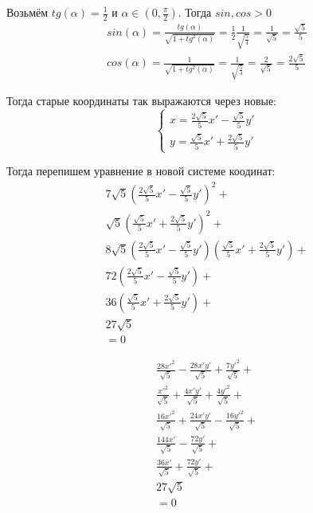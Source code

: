 \documentclass[12pt, a4paper]{article}
\begin{document}
    Возьмём $tg(\alpha) = \frac{1}{2}$ и $\alpha \in (0, \frac{\pi}{2})$.
    Тогда $sin, cos > 0$
    \begin{gather}
        sin(\alpha) = \frac{tg(\alpha)}{\sqrt{1 + tg^2(\alpha)}} = \frac{1}{2} \frac{1}{\sqrt{\frac{5}{4}}} = \frac{1}{\sqrt{5}} = \frac{\sqrt{5}}{5} \\
        cos(\alpha) = \frac{1}{\sqrt{1 + tg^2(\alpha)}} = \frac{1}{\sqrt{\frac{5}{4}}} = \frac{2}{\sqrt{5}} = \frac{2\sqrt{5}}{5}
    \end{gather}

    Тогда старые координаты так выражаются через новые:
    \begin{equation}
        \begin{cases}
            x = \frac{2\sqrt{5}}{5} x' - \frac{\sqrt{5}}{5} y' \\
            y = \frac{\sqrt{5}}{5} x' + \frac{2\sqrt{5}}{5} y'
        \end{cases}
    \end{equation}

    Тогда перепишем уравнение в новой системе коодинат:
    \begin{multline}
        7\sqrt{5} \left(\frac{2\sqrt{5}}{5} x' - \frac{\sqrt{5}}{5} y'\right)^2 + \\
        \sqrt{5} \left(\frac{\sqrt{5}}{5} x' + \frac{2\sqrt{5}}{5} y'\right)^2 + \\
        8\sqrt{5} \left(\frac{2\sqrt{5}}{5} x' - \frac{\sqrt{5}}{5} y'\right)\left(\frac{\sqrt{5}}{5} x' + \frac{2\sqrt{5}}{5} y'\right) + \\
        72 \left(\frac{2\sqrt{5}}{5} x' - \frac{\sqrt{5}}{5} y'\right) + \\
        36 \left(\frac{\sqrt{5}}{5} x' + \frac{2\sqrt{5}}{5} y' \right) + \\
        27\sqrt{5} \\
        = 0
    \end{multline}

    \begin{multline}
        \frac{28 x'^2}{\sqrt{5}} - \frac{28 x' y'}{\sqrt{5}} + \frac{7 y'^2}{\sqrt{5}} + \\
        \frac{x'^2}{\sqrt{5}} + \frac{4 x' y'}{\sqrt{5}} + \frac{4 y'^2}{\sqrt{5}} + \\
        \frac{16 x'^2}{\sqrt{5}} + \frac{24 x' y'}{\sqrt{5}} - \frac{16 y'^2}{\sqrt{5}} + \\
        \frac{144 x'}{\sqrt{5}} - \frac{72 y'}{\sqrt{5}} + \\
        \frac{36 x'}{\sqrt{5}} + \frac{72 y'}{\sqrt{5}} + \\
        27\sqrt{5} \\
        = 0
    \end{multline}
\end{document}
